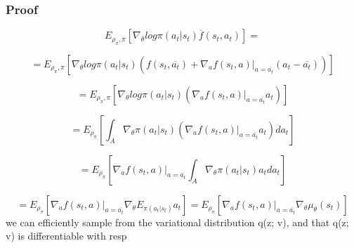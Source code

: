 \documentclass{beamer}
\begin{document}
\begin{frame}[t]
\frametitle{Proof}

\begin{equation}
 E_{\rho_\pi, \pi} \left[ \nabla_\theta log \pi(a_t | s_t) \overline{f} (s_t, a_t) \right] =
\end{equation}

\begin{equation}
= E_{\rho_\pi, \pi} \left[ \nabla_\theta log \pi(a_t | s_t) (f (s_t, \overline{a_t}) + 
\nabla_a f(s_t, a) |_{a=\overline{a_t}} (a_t - \overline{a_t})) \right]
\end{equation}

\begin{equation}
= E_{\rho_\pi, \pi} \left[ \nabla_\theta log \pi(a_t | s_t) ( 
\nabla_a f(s_t, a) |_{a=\overline{a_t}} a_t) \right]
\end{equation}

\begin{equation}
= E_{\rho_\pi} \left[ \int_{A} \nabla_\theta \pi(a_t | s_t) ( 
\nabla_a f(s_t, a) |_{a=\overline{a_t}} a_t) da_t \right]
\end{equation}

\begin{equation}
= E_{\rho_\pi} \left[ \nabla_a f(s_t, a) |_{a=\overline{a_t}} \int_{A} \nabla_\theta \pi(a_t | s_t) a_t da_t \right]
\end{equation}

\begin{equation}
= E_{\rho_\pi} \left[ \nabla_a f(s_t, a) |_{a=\overline{a_t}} \nabla_\theta E_{\pi(a_t | s_t)} a_t \right] = E_{\rho_\pi} \left[ \nabla_a f(s_t, a) |_{a=\overline{a_t}} \nabla_\theta \mu_\theta(s_t) \right]
\end{equation}we can efficiently sample from
the variational distribution q(z; v), and that q(z; v) is differentiable with resp

\end{frame}
\end{document}
